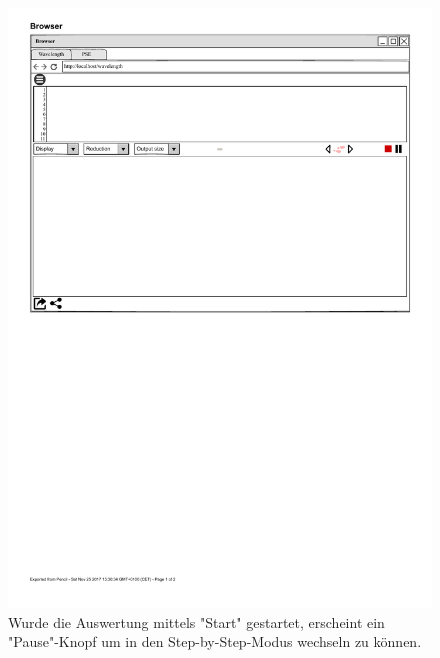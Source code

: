 \documentclass[parskip=full,11pt,twoside]{scrartcl}
\begin{document}
\begin{figure}[H]
	\centering
	\includegraphics{img/pauseButton}
	\caption{Wurde die Auswertung mittels "Start" gestartet, erscheint ein "Pause"-Knopf um in den Step-by-Step-Modus wechseln zu können.}
\end{figure}
\end{document}
